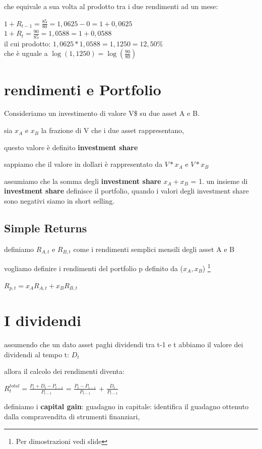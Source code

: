 \documentclass[a4paper,11pt]{report}
\begin{document}
{	che equivale a sua volta al prodotto tra i due rendimenti ad un mese:
	\begin{center}
	$1+R_{t-1}= {\frac {85}{80}}  =1,0625-0= 1+0,0625 $\\
	$1+R_t = {\frac {90}{85}}  =1,0588=1+ 0,0588 $ \\
	 il cui prodotto:  $1,0625*1,0588=1,1250 = 12,50\% $ \\
	che è uguale a $\log{(1,1250)}= \log{({\frac{90}{80}})}$ \\
	\end{center}
\section{rendimenti e Portfolio}
	Consideriamo un investimento di valore V\$ su due asset A e B.

	sia $x_A$ e $x_B$ la frazione di V che i due asset rappresentano,

	questo valore è definito \textbf{investment share}

	sappiamo che il valore in dollari è rappresentato da $V*x_A$ e $V*x_B$

	assumiamo che la somma degli \textbf{investment share} $x_A + x_B$ = 1. \newline
	un insieme di \textbf{investment share} definisce il portfolio,
	quando i valori degli investment share sono negativi siamo in short selling.
\subsection{Simple Returns}
	definiamo $R_{A,t}$ e $R_{B,t}$ come i rendimenti semplici mensili degli asset A e B

	vogliamo definire i rendimenti del portfolio p definito da ($x_A,x_B$) \footnote{Per dimostrazioni vedi slide}

\begin{center}
	$R_{p,t} = x_A R_{A,t} + x_B R_{B,t}$
\end{center}
\section{I dividendi}
	assumendo che un dato asset paghi dividendi tra t-1 e t  abbiamo il valore dei dividendi al tempo t: $D_t$
	
	allora il calcolo dei rendimenti diventa:

\begin{center}
	$R_t^{total} = {\frac{P_t + D_t - P_{t-1}}{P_{t-1}}}$ = ${\frac {P_t - P_{t-1}}{P_{t-1}}}$
	 + ${\frac {D_t}{P_{t-1}}}$
\end{center}
 	definiamo i \textbf{capital gain}: guadagno in capitale: identifica il guadagno ottenuto dalla compravendita di strumenti finanziari,

}
\end{document}
